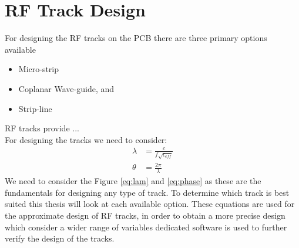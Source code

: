 \documentclass[12pt,openany,a4paper]{book}
\begin{document}
\section{RF Track Design}
For designing the RF tracks on the PCB there are three primary options available
\begin{itemize}[noitemsep,topsep=0.5pt]
	\item Micro-strip
	\item Coplanar Wave-guide, and
	\item Strip-line
\end{itemize}
RF tracks provide ...\\
For designing the tracks we need to consider:
\begin{align}
\lambda&= \frac{c}{f\sqrt{\epsilon_{eff}}} \label{eq:lam} \\
\theta &= \frac{2 \pi}{\lambda} \label{eq:phase}
\end{align}
We need to consider the Figure \ref{eq:lam} and \ref{eq:phase} as these are the fundamentals for designing any type of track. To determine which track is best suited this thesis will look at each available option.\newline
These equations are used for the approximate design of RF tracks, in order to obtain a more precise design which consider a wider range of variables dedicated software is  used to further verify the design of the tracks.
\end{document}
